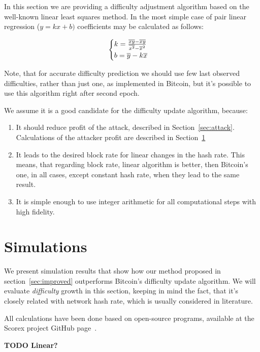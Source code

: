\documentclass[number,preprint,review]{elsarticle}
\begin{document}
In this section we are providing a difficulty adjustment algorithm based on the well-known linear least squares method\cite{lawson1974solving}. In the most simple case of pair linear regression (\(y=kx+b)\) coefficients may be calculated as follows:

\begin{equation}
  \begin{cases}
    k= {{\overline{xy} - \overline{x}\overline{y}} \over {\overline{x^2} - \overline{x}^2}}  \\
    b= \overline{y}-k\overline{x}
  \end{cases}
\end{equation}

Note, that for accurate difficulty prediction we should use few last observed difficulties, rather than just one, as implemented in Bitcoin, but it's possible to use this algorithm right after second epoch.


We assume it is a good candidate for the difficulty update algorithm, because:
\begin{enumerate}
\item{It should reduce profit of the attack, described in Section~\ref{sec:attack}. Calculations of the attacker profit are described in Section~\ref{sec:sim}}
\item{It leads to the desired block rate for linear changes in the hash rate.
This means, that regarding block rate, linear algorithm is better, then Bitcoin's one, in all cases, except constant hash rate, when they lead to the same result. }
\item{It is simple enough to use integer arithmetic for all computational steps with high fidelity.}
\end{enumerate}

\section{Simulations}
\label{sec:sim}

We present simulation results that show how our method proposed in section~\ref{sec:improved} outperforms Bitcoin’s difficulty update algorithm.
We will evaluate \textit{difficulty} growth in this section, keeping in mind the fact, that it's closely related with network hash rate, which is usually considered in literature.

All calculations have been done based on open-source programs, available at the Scorex project GitHub page~\cite{scorex}.

\textbf{TODO Linear?}
\end{document}
